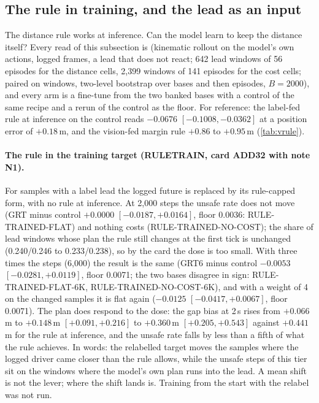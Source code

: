 \subsection{The rule in training, and the lead as an input}\label{sec:ruletrain}
The distance rule works at inference. Can the model learn to keep the distance itself? Every read of this subsection is  (kinematic rollout on the model's own actions, logged frames, a lead that does not react; 642 lead windows of 56 episodes for the distance cells, 2,399 windows of 141 episodes for the cost cells; paired on windows, two-level bootstrap over bases and then episodes, $B=2000$), and every arm is a fine-tune from the two banked bases with a control of the same recipe and a rerun of the control as the floor. For reference: the label-fed rule at inference on the control reads $-0.0676$ $[-0.1008,-0.0362]$ at a position error of $+0.18$\,m, and the vision-fed margin rule $+0.86$ to $+0.95$\,m (\cref{tab:vrule}).

\paragraph{The rule in the training target (RULETRAIN, card ADD32 with note N1).} For samples with a label lead the logged future is replaced by its rule-capped form, with no rule at inference. At 2,000 steps the unsafe rate does not move (GRT minus control $+0.0000$ $[-0.0187,+0.0164]$, floor 0.0036: RULE-TRAINED-FLAT) and nothing costs (RULE-TRAINED-NO-COST); the share of lead windows whose plan the rule still changes at the first tick is unchanged (0.240/0.246 to 0.233/0.238), so by the card the dose is too small. With three times the steps (6,000) the result is the same (GRT6 minus control $-0.0053$ $[-0.0281,+0.0119]$, floor 0.0071; the two bases disagree in sign: RULE-TRAINED-FLAT-6K, RULE-TRAINED-NO-COST-6K), and with a weight of 4 on the changed samples it is flat again ($-0.0125$ $[-0.0417,+0.0067]$, floor 0.0071). The plan does respond to the dose: the gap bias at 2\,s rises from $+0.066$\,m to $+0.148$\,m $[+0.091,+0.216]$ to $+0.360$\,m $[+0.205,+0.543]$ against $+0.441$\,m for the rule at inference, and the unsafe rate falls by less than a fifth of what the rule achieves. In words: the relabelled target moves the samples where the logged driver came closer than the rule allows, while the unsafe steps of this tier sit on the windows where the model's own plan runs into the lead. A mean shift is not the lever; where the shift lands is. Training from the start with the relabel was not run.

